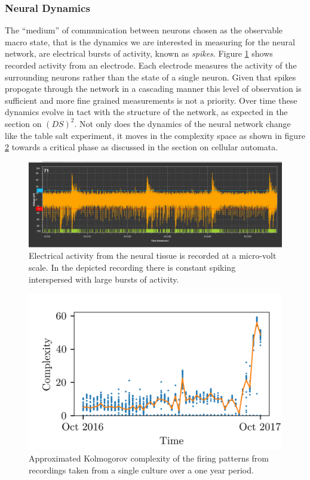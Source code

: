 \subsubsection{Neural Dynamics}
The ``medium'' of communication between neurons chosen as the observable macro
state, that is the dynamics we are interested in measuring for the neural
network, are electrical bursts of activity, known as \emph{spikes}.
Figure \ref{figWave} shows recorded activity from an electrode.
Each electrode measures the activity of the surrounding neurons rather than the
state of a single neuron.
Given that spikes propogate through the network in a cascading manner this
level of observation is sufficient and more fine grained measurements is not a
priority.
Over time these dynamics evolve in tact with the structure of the network, as
expected in the section on $(DS)^2$.
Not only does the dynamics of the neural network change like the table salt
experiment, it moves in the complexity space as shown in figure \ref{figDopey} towards
a critical phase as discussed in the section on cellular automata.
%
\begin{figure}[h]
  \centering
  \includegraphics[width=1\textwidth]{fig/PacemakerBurst.png}
  \caption{
    Electrical activity from the neural tissue is recorded at a micro-volt
    scale.
    In the depicted recording there is constant spiking interspersed with large
    bursts of activity.
  }
  \label{figWave}
\end{figure}
%
\begin{figure}[h]
  \centering
  \includegraphics[width=1\textwidth]{fig/dopeyComplexity.png}
  \caption{
    Approximated Kolmogorov complexity of the firing patterns from recordings
    taken from a single culture over a one year period.
  }
  \label{figDopey}
\end{figure}
